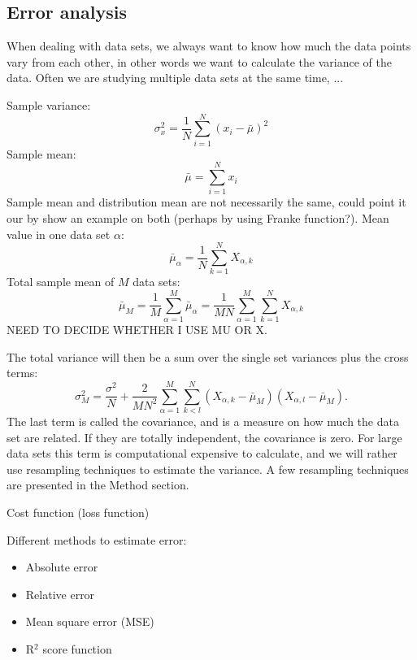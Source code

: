 \subsection{Error analysis} \label{sec:error_analysis}
When dealing with data sets, we always want to know how much the data points vary from each other, in other words we want to calculate the variance of the data. Often we are studying multiple data sets at the same time, ...

Sample variance:
\begin{equation}
\sigma_x^2=\frac{1}{N}\sum_{i=1}^N(x_i-\bar{\mu})^2
\end{equation}
Sample mean:
\begin{equation}
\bar{\mu}=\sum_{i=1}^Nx_i
\end{equation}
Sample mean and distribution mean are not necessarily the same, could point it our by show an example on both (perhaps by using Franke function?).
Mean value in one data set $\alpha$:
\begin{equation}
\bar{\mu}_{\alpha}=\frac{1}{N}\sum_{k=1}^NX_{\alpha,k}
\end{equation}
Total sample mean of $M$ data sets:
\begin{equation}
\bar{\mu}_M=\frac{1}{M}\sum_{\alpha=1}^M\bar{\mu}_{\alpha}=\frac{1}{MN}\sum_{\alpha=1}^M\sum_{k=1}^NX_{\alpha,k}
\end{equation}
NEED TO DECIDE WHETHER I USE MU OR X.

The total variance will then be a sum over the single set variances plus the cross terms:
\begin{equation}
\sigma_M^2=\frac{\sigma^2}{N}+\frac{2}{MN^2}\sum_{\alpha=1}^M\sum_{k<l}^N(X_{\alpha,k}-\bar{\mu}_M)(X_{\alpha,l}-\bar{\mu}_M).
\end{equation}
The last term is called the covariance, and is a measure on how much the data set are related. If they are totally independent, the covariance is zero. For large data sets this term is computational expensive to calculate, and we will rather use resampling techniques to estimate the variance. A few resampling techniques are presented in the Method section.

Cost function (loss function) 

Different methods to estimate error:
\begin{itemize}
\item{Absolute error}
\item{Relative error}
\item{Mean square error (MSE)}
\item{R$^2$ score function}
\end{itemize}

